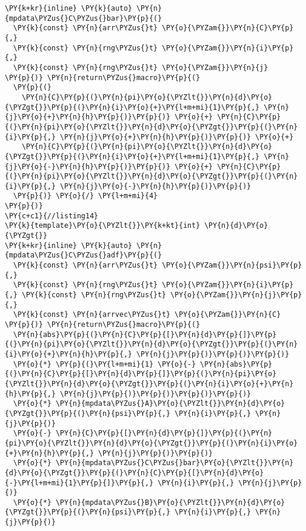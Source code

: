\begin{Verbatim}[commandchars=\\\{\}]
\PY{k+kr}{inline} \PY{k}{auto} \PY{n}{mpdata\PYZus{}C\PYZus{}bar}\PY{p}{(}
  \PY{k}{const} \PY{n}{arr\PYZus{}t} \PY{o}{\PYZam{}}\PY{n}{C}\PY{p}{,} 
  \PY{k}{const} \PY{n}{rng\PYZus{}t} \PY{o}{\PYZam{}}\PY{n}{i}\PY{p}{,} 
  \PY{k}{const} \PY{n}{rng\PYZus{}t} \PY{o}{\PYZam{}}\PY{n}{j}
\PY{p}{)} \PY{n}{return\PYZus{}macro}\PY{p}{(}
  \PY{p}{(}
    \PY{n}{C}\PY{p}{(}\PY{n}{pi}\PY{o}{\PYZlt{}}\PY{n}{d}\PY{o}{\PYZgt{}}\PY{p}{(}\PY{n}{i}\PY{o}{+}\PY{l+m+mi}{1}\PY{p}{,} \PY{n}{j}\PY{o}{+}\PY{n}{h}\PY{p}{)}\PY{p}{)} \PY{o}{+} \PY{n}{C}\PY{p}{(}\PY{n}{pi}\PY{o}{\PYZlt{}}\PY{n}{d}\PY{o}{\PYZgt{}}\PY{p}{(}\PY{n}{i}\PY{p}{,} \PY{n}{j}\PY{o}{+}\PY{n}{h}\PY{p}{)}\PY{p}{)} \PY{o}{+}
    \PY{n}{C}\PY{p}{(}\PY{n}{pi}\PY{o}{\PYZlt{}}\PY{n}{d}\PY{o}{\PYZgt{}}\PY{p}{(}\PY{n}{i}\PY{o}{+}\PY{l+m+mi}{1}\PY{p}{,} \PY{n}{j}\PY{o}{-}\PY{n}{h}\PY{p}{)}\PY{p}{)} \PY{o}{+} \PY{n}{C}\PY{p}{(}\PY{n}{pi}\PY{o}{\PYZlt{}}\PY{n}{d}\PY{o}{\PYZgt{}}\PY{p}{(}\PY{n}{i}\PY{p}{,} \PY{n}{j}\PY{o}{-}\PY{n}{h}\PY{p}{)}\PY{p}{)} 
  \PY{p}{)} \PY{o}{/} \PY{l+m+mi}{4}
\PY{p}{)}
\PY{c+c1}{//listing14}
\PY{k}{template}\PY{o}{\PYZlt{}}\PY{k+kt}{int} \PY{n}{d}\PY{o}{\PYZgt{}}
\PY{k+kr}{inline} \PY{k}{auto} \PY{n}{mpdata\PYZus{}C\PYZus{}adf}\PY{p}{(}
  \PY{k}{const} \PY{n}{arr\PYZus{}t} \PY{o}{\PYZam{}}\PY{n}{psi}\PY{p}{,} 
  \PY{k}{const} \PY{n}{rng\PYZus{}t} \PY{o}{\PYZam{}}\PY{n}{i}\PY{p}{,} \PY{k}{const} \PY{n}{rng\PYZus{}t} \PY{o}{\PYZam{}}\PY{n}{j}\PY{p}{,}
  \PY{k}{const} \PY{n}{arrvec\PYZus{}t} \PY{o}{\PYZam{}}\PY{n}{C}
\PY{p}{)} \PY{n}{return\PYZus{}macro}\PY{p}{(}
  \PY{n}{abs}\PY{p}{(}\PY{n}{C}\PY{p}{[}\PY{n}{d}\PY{p}{]}\PY{p}{(}\PY{n}{pi}\PY{o}{\PYZlt{}}\PY{n}{d}\PY{o}{\PYZgt{}}\PY{p}{(}\PY{n}{i}\PY{o}{+}\PY{n}{h}\PY{p}{,} \PY{n}{j}\PY{p}{)}\PY{p}{)}\PY{p}{)} 
  \PY{o}{*} \PY{p}{(}\PY{l+m+mi}{1} \PY{o}{-} \PY{n}{abs}\PY{p}{(}\PY{n}{C}\PY{p}{[}\PY{n}{d}\PY{p}{]}\PY{p}{(}\PY{n}{pi}\PY{o}{\PYZlt{}}\PY{n}{d}\PY{o}{\PYZgt{}}\PY{p}{(}\PY{n}{i}\PY{o}{+}\PY{n}{h}\PY{p}{,} \PY{n}{j}\PY{p}{)}\PY{p}{)}\PY{p}{)}\PY{p}{)} 
  \PY{o}{*} \PY{n}{mpdata\PYZus{}A}\PY{o}{\PYZlt{}}\PY{n}{d}\PY{o}{\PYZgt{}}\PY{p}{(}\PY{n}{psi}\PY{p}{,} \PY{n}{i}\PY{p}{,} \PY{n}{j}\PY{p}{)} 
  \PY{o}{-} \PY{n}{C}\PY{p}{[}\PY{n}{d}\PY{p}{]}\PY{p}{(}\PY{n}{pi}\PY{o}{\PYZlt{}}\PY{n}{d}\PY{o}{\PYZgt{}}\PY{p}{(}\PY{n}{i}\PY{o}{+}\PY{n}{h}\PY{p}{,} \PY{n}{j}\PY{p}{)}\PY{p}{)} 
  \PY{o}{*} \PY{n}{mpdata\PYZus{}C\PYZus{}bar}\PY{o}{\PYZlt{}}\PY{n}{d}\PY{o}{\PYZgt{}}\PY{p}{(}\PY{n}{C}\PY{p}{[}\PY{n}{d}\PY{o}{-}\PY{l+m+mi}{1}\PY{p}{]}\PY{p}{,} \PY{n}{i}\PY{p}{,} \PY{n}{j}\PY{p}{)}
  \PY{o}{*} \PY{n}{mpdata\PYZus{}B}\PY{o}{\PYZlt{}}\PY{n}{d}\PY{o}{\PYZgt{}}\PY{p}{(}\PY{n}{psi}\PY{p}{,} \PY{n}{i}\PY{p}{,} \PY{n}{j}\PY{p}{)}

\end{Verbatim}
